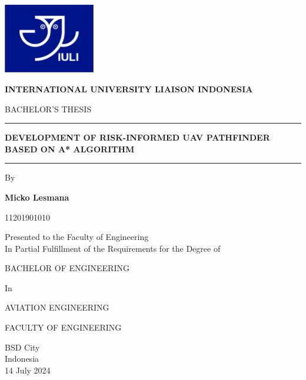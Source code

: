 \documentclass[12pt]{report}
\begin{document}
    \begin{titlepage}
        \centering
        \includegraphics[width=0.3\textwidth]{General Image/IULISymbol.PNG}\par
        \vspace{1px}
        {\textbf{INTERNATIONAL UNIVERSITY LIAISON INDONESIA}}\par
        {BACHELOR'S THESIS}\par
        \rule{16cm}{1pt}\par
        {\textbf{DEVELOPMENT OF RISK-INFORMED UAV PATHFINDER BASED ON A* ALGORITHM}}\par\vspace{0.1cm}
        \rule{16cm}{1pt}\par\vspace{1cm}
        By\par\vspace{0.5cm}
    
        \textbf{Micko Lesmana}\par
        {11201901010}\par
        Presented to the Faculty of Engineering\\
        In Partial Fulfillment of the Requirements for the Degree of\par\vspace{0.5cm}
        
        {BACHELOR OF ENGINEERING}\par
        {In}\par
        {AVIATION ENGINEERING}\par\vspace{1cm}
        
        {FACULTY OF ENGINEERING}\par\vspace{1cm}
        
        {BSD City\\
        Indonesia\\
        14 July 2024}
        
    \end{titlepage}
\end{document}
